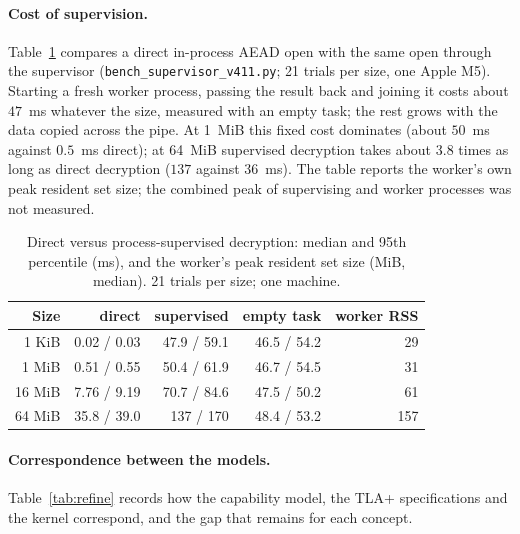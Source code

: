 \documentclass[pdflatex,sn-mathphys-num]{sn-jnl}
\newcommand{\code}[1]{\texttt{#1}}
\begin{document}
\paragraph{Cost of supervision.}
Table~\ref{tab:supervisor} compares a direct in-process AEAD open with the same open through the supervisor (\code{bench\_supervisor\_v411.py}; 21 trials per size, one Apple M5). Starting a fresh worker process, passing the result back and joining it costs about $47$~ms whatever the size, measured with an empty task; the rest grows with the data copied across the pipe. At 1~MiB this fixed cost dominates (about $50$~ms against $0.5$~ms direct); at 64~MiB supervised decryption takes about $3.8$ times as long as direct decryption ($137$ against $36$~ms). The table reports the worker's own peak resident set size; the combined peak of supervising and worker processes was not measured.

\begin{table}[htbp]
\caption{Direct versus process-supervised decryption: median and 95th percentile (ms), and the worker's peak resident set size (MiB, median). 21 trials per size; one machine.}\label{tab:supervisor}
\centering\footnotesize
\begin{tabular}{@{}rrrrr@{}}\toprule
Size & direct & supervised & empty task & worker RSS\\\midrule
1 KiB & 0.02 / 0.03 & 47.9 / 59.1 & 46.5 / 54.2 & 29\\
1 MiB & 0.51 / 0.55 & 50.4 / 61.9 & 46.7 / 54.5 & 31\\
16 MiB & 7.76 / 9.19 & 70.7 / 84.6 & 47.5 / 50.2 & 61\\
64 MiB & 35.8 / 39.0 & 137 / 170 & 48.4 / 53.2 & 157\\\bottomrule
\end{tabular}
\end{table}

\paragraph{Correspondence between the models.}
Table~\ref{tab:refine} records how the capability model, the TLA+ specifications and the kernel correspond, and the gap that remains for each concept.
\end{document}
